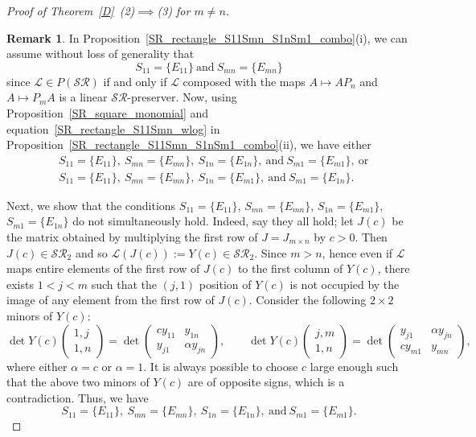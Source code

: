 \documentclass[11pt,reqno]{amsart}
\theoremstyle{plain}
\theoremstyle{definition}
\newtheorem{rem}[theorem]{Remark}
\numberwithin{equation}{section}
\begin{document}
\begin{proof}[Proof of Theorem~\ref{D}~(2)$\implies$(3) for $m\neq n$]
	\begin{rem}
		In Proposition~\ref{SR_rectangle_S11Smn_S1nSm1_combo}(i), we can assume without loss of generality that
		\begin{equation}\label{SR_rectangle_S11Smn_wlog}
			S_{11}=\{E_{11}\}~\text{and}~S_{mn}=\{E_{mn}\}
		\end{equation}
		since $\mathcal{L}\in P(\mathcal{SR})$ if and only if $\mathcal{L}$ composed with the maps $A\mapsto AP_n$ and $A\mapsto P_mA$ is a linear $\mathcal{SR}$-preserver. Now, using Proposition~\ref{SR_square_monomial} and equation~\eqref{SR_rectangle_S11Smn_wlog} in  Proposition~\ref{SR_rectangle_S11Smn_S1nSm1_combo}(ii), we have either
		\begin{align*}
			&S_{11}=\{E_{11}\},~ S_{mn}=\{E_{mn}\},~ S_{1n}=\{E_{1n}\}, ~\text{and}~ S_{m1}=\{E_{m1}\},~\text{or} \\
			&S_{11}=\{E_{11}\},~ S_{mn}=\{E_{mn}\},~ S_{1n}=\{E_{m1}\}, ~\text{and}~ S_{m1}=\{E_{1n}\}.
		\end{align*}
	\end{rem}
	Next, we show that the conditions $S_{11}=\{E_{11}\}$, $S_{mn}=\{E_{mn}\}$, $S_{1n}=\{E_{m1}\}$, $S_{m1}=\{E_{1n}\}$ do not simultaneously hold. Indeed, say they all hold; let $J(c)$ be the matrix obtained by multiplying the first row of $J=J_{m\times n}$ by $c>0$. Then $J(c)\in \mathcal{SR}_2$ and so $\mathcal{L}(J(c)):=Y(c)\in \mathcal{SR}_2$. Since $m>n$, hence even if $\mathcal{L}$ maps entire elements of the first row of $J(c)$ to the first column of $Y(c)$, there exists $1<j<m$ such that the $(j,1)$ position of $Y(c)$ is not occupied by the image of any element from the first row of $J(c)$. Consider the following $2 \times 2$ minors of $Y(c)$:
	\[ \det Y(c)\begin{pmatrix}1,j\\1,n\end{pmatrix} =
	\det\begin{pmatrix}
		cy_{11} & y_{1n} \\
		y_{j1} & \alpha y_{jn}
	\end{pmatrix}, \qquad
	\det Y(c)\begin{pmatrix}j,m\\1,n\end{pmatrix}
	= \det\begin{pmatrix}
		y_{j1} & \alpha y_{jn} \\
		cy_{m1} & y_{mn}
	\end{pmatrix},\]
	where either $\alpha=c$ or $\alpha=1$. It is always possible to choose $c$ large enough such that the above two minors of $Y(c)$ are of opposite signs, which is a contradiction. Thus, we have
	\begin{equation}\label{SR_rectangle_S11SmnS1nSm1_wlog}
		S_{11}=\{E_{11}\},~ S_{mn}=\{E_{mn}\},~ S_{1n}=\{E_{1n}\}, ~\text{and}~ S_{m1}=\{E_{m1}\}. 
	\end{equation}
	

\end{proof}
\end{document}

